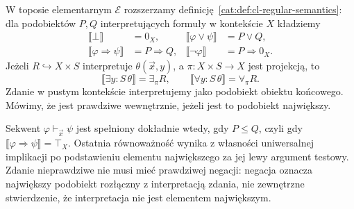 \begin{definicja}\label{cat:def:cl-internal-logic}
W toposie elementarnym $\mathcal E$ rozszerzamy definicję~\ref{cat:def:cl-regular-semantics}: dla podobiektów $P,Q$ interpretujących formuły w kontekście $X$ kładziemy
\[
\begin{aligned}
 \llbracket\bot\rrbracket&=0_X,&
 \llbracket\varphi\vee\psi\rrbracket&=P\vee Q,\\
 \llbracket\varphi\Rightarrow\psi\rrbracket&=P\Rightarrow Q,&
 \llbracket\neg\varphi\rrbracket&=P\Rightarrow0_X.
\end{aligned}
\]
Jeżeli $R\hookrightarrow X\times S$ interpretuje $\theta(\vec x,y)$, a $\pi:X\times S\to X$ jest projekcją, to
\[
 \llbracket\exists y:S\,\theta\rrbracket=\exists_\pi R,\qquad
 \llbracket\forall y:S\,\theta\rrbracket=\forall_\pi R.
\]
Zdanie w pustym kontekście interpretujemy jako podobiekt obiektu końcowego. Mówimy, że jest prawdziwe wewnętrznie, jeżeli jest to podobiekt największy.
\end{definicja}

Sekwent $\varphi\vdash_{\vec x}\psi$ jest spełniony dokładnie wtedy, gdy $P\leq Q$, czyli gdy $\llbracket\varphi\Rightarrow\psi\rrbracket=\top_X$. Ostatnia równoważność wynika z własności uniwersalnej implikacji po podstawieniu elementu największego za jej lewy argument testowy. Zdanie nieprawdziwe nie musi mieć prawdziwej negacji: negacja oznacza największy podobiekt rozłączny z interpretacją zdania, nie zewnętrzne stwierdzenie, że interpretacja nie jest elementem największym.

